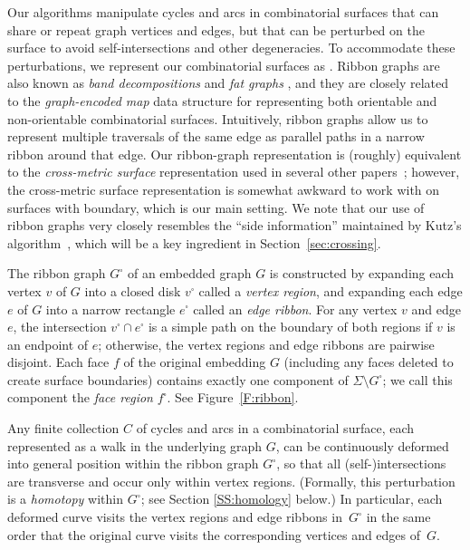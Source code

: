 \documentclass[letterpaper,review]{siamart190516}
\begin{document}
Our algorithms manipulate cycles and arcs in combinatorial surfaces that can share or repeat graph vertices and edges, but that can be perturbed on the surface to avoid self-intersections and other degeneracies.  To accommodate these perturbations, we represent our combinatorial surfaces as  \cite{l-gos-2004,em-gos-13}.  Ribbon graphs are also known as \emph{band decompositions} \cite{em-gos-13} and \emph{fat graphs} \cite{l-gos-2004}, and they are closely related to the \emph{graph-encoded map} data structure \cite{l-gem-82} for representing both orientable and non-orientable combinatorial surfaces.  Intuitively, ribbon graphs allow us to represent multiple traversals of the same edge as parallel paths in a narrow ribbon around that edge.  Our ribbon-graph representation is (roughly) equivalent to the \emph{cross-metric surface} representation used in several other papers~\cite{ce-tspcs-06,cl-opdsh-07,ccelw-scsih-08}; however, the cross-metric surface representation is somewhat awkward to work with on surfaces with boundary, which is our main setting.  We note that our use of ribbon graphs very closely resembles the “side information” maintained by Kutz’s algorithm~\cite[Section 4.1]{k-csnco-06}, which will be a key ingredient in Section~\ref{sec:crossing}. 

The ribbon graph $G^\square$ of an embedded graph $G$ is constructed by expanding each vertex $v$ of $G$ into a closed disk $v^\square$ called a \emph{vertex region}, and expanding each edge $e$ of $G$ into a narrow rectangle $e^\square$ called an \emph{edge ribbon}.  For any vertex $v$ and edge $e$, the intersection $v^\square\cap e^\square$ is a simple path on the boundary of both regions if $v$ is an endpoint of $e$; otherwise, the vertex regions and edge ribbons are pairwise disjoint.  Each face $f$ of the original embedding $G$ (including any faces deleted to create surface boundaries) contains exactly one component of $\Sigma\setminus G^\square$; we call this component the \emph{face region} $f^\square$.  See Figure~\ref{F:ribbon}.

Any finite collection $C$ of cycles and arcs in a combinatorial surface, each represented as a walk in the underlying graph $G$, can be continuously deformed into general position within the ribbon graph $G^\square$, so that all (self-)intersections are transverse and occur only within vertex regions.  (Formally, this perturbation is a \emph{homotopy} within $G^\square$; see Section \ref{SS:homology} below.)  In particular, each deformed curve visits the vertex regions and edge ribbons in~$G^\square$ in the same order that the original curve visits the corresponding vertices and edges of~$G$.
\end{document}
